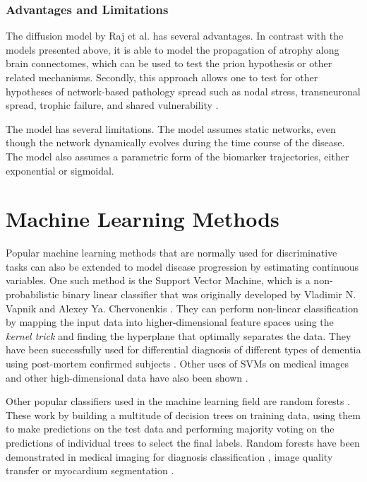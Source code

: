 \subsubsection{Advantages and Limitations}

The diffusion model by Raj et al. \cite{raj2012network} has several advantages. In contrast with the models presented above, it is able to model the propagation of atrophy along brain connectomes, which can be used to test the prion hypothesis or other related mechanisms. Secondly, this approach allows one to test for other hypotheses of network-based pathology spread such as nodal stress, transneuronal spread, trophic failure, and shared vulnerability \cite{zhou2012predicting}.

The model has several limitations. The model assumes static networks, even though the network dynamically evolves during the time course of the disease. The model also assumes a parametric form of the biomarker trajectories, either exponential or sigmoidal. 

\section{Machine Learning Methods}
\label{sec:bckMac}

Popular machine learning methods that are normally used for discriminative tasks can also be extended to model disease progression by estimating continuous variables. One such method is the Support Vector Machine, which is a non-probabilistic binary linear classifier that was originally developed by Vladimir N. Vapnik and Alexey Ya. Chervonenkis \cite{vapnik2006estimation}. They can perform non-linear classification by mapping the input data into higher-dimensional feature spaces using the \emph{kernel trick} and finding the hyperplane that optimally separates the data. They have been successfully used for differential diagnosis of different types of dementia using post-mortem confirmed subjects \cite{kloppel2008automatic}. Other uses of SVMs on medical images and other high-dimensional data have also been shown \cite{lao2004morphological,fan2005classification,mourao2005classifying,kawasaki2007multivariate}.

Other popular classifiers used in the machine learning field are random forests \cite{ho1995random,breiman2001random}. These work by building a multitude of decision trees on training data, using them to make predictions on the test data and performing majority voting on the predictions of individual trees to select the final labels. Random forests have been demonstrated in medical imaging for diagnosis classification \cite{gray2013random}, image quality transfer \cite{alexander2014image} or myocardium segmentation \cite{lempitsky2009random}. 

